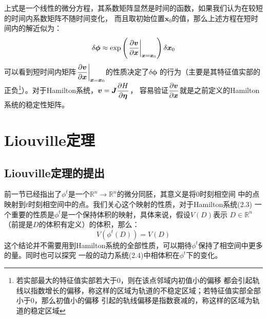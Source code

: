     上式是一个线性的微分方程，其系数矩阵显然是时间的函数，如果我们认为在较短的时间内系数矩阵不随时间变化，
    而且取初始位置$\bm{x}_0$的值，那么上述方程在短时间内的解近似为：
    \begin{equation}
        \delta \bm{\phi} \approx \exp\left(\left.\frac{\partial{\bm{v}}}{\partial{\bm{x}}}\right|_{\bm{x} = \bm{x}_0}\right) \delta\bm{x}_0
    \end{equation}
    可以看到短时间内矩阵$\displaystyle\left.\frac{\partial{\bm{v}}}{\partial{\bm{x}}}\right|_{\bm{x} = \bm{x}_0}$的性质决定了$\delta\bm{\phi}$
    的行为（主要是其特征值实部的正负\footnote{若实部最大的特征值实部若大于0，则在该点邻域内初值小的偏移
    都会引起轨线以指数增长的偏移，称这样的区域为轨道的不稳定区域；若特征值实部全部小于0，那么初值小的偏移
    引起的轨线偏移是指数衰减的，称这样的区域为轨道的稳定区域}）。对于Hamilton系统，$\displaystyle\bm{v} = \bm{J}\frac{\partial{H}}{\partial{\bm{\eta}}}$，
    容易验证$\displaystyle\frac{\partial{\bm{v}}}{\partial{\bm{x}}}$就是之前定义的Hamilton系统的稳定性矩阵。
    \section{Liouville定理}
    \subsection{Liouville定理的提出}
    前一节已经指出了$\phi^t$是一个$\mathbb{R}^n\to\mathbb{R}^n$的微分同胚，其意义是将0时刻相空间
    中的点映射到$t$时刻相空间中的点。我们关心这个映射的性质，对于Hamilton系统(2.3)
    一个重要的性质是$\phi^t$是一个保持体积的映射，具体来说，假设$V(D)$表示
    $D\in\mathbb{R}^n$（前提是$D$的体积有定义）的体积，那么：
    \begin{equation}
        V(\phi^t(D)) = V(D)
    \end{equation}
    这个结论并不需要用到Hamilton系统的全部性质，可以期待$\phi^t$保持了相空间中更多的量。同时也可以探究
    一般的动力系统(2.4)中相体积在$\phi^t$下的变化。
